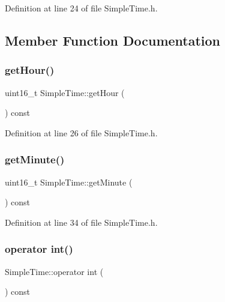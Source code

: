 Definition at line 24 of file Simple\+Time.\+h.



\subsection{Member Function Documentation}
\mbox{\label{class_simple_time_a386922a41d88aaab69497730b163cadf}} 
\subsubsection{\texorpdfstring{getHour()}{getHour()}}
{\footnotesize\ttfamily uint16\+\_\+t Simple\+Time\+::get\+Hour (\begin{DoxyParamCaption}{ }\end{DoxyParamCaption}) const\hspace{0.3cm}{\ttfamily [inline]}}



Definition at line 26 of file Simple\+Time.\+h.

\mbox{\label{class_simple_time_a02c7df278fb87be73998306330198018}} 
\subsubsection{\texorpdfstring{getMinute()}{getMinute()}}
{\footnotesize\ttfamily uint16\+\_\+t Simple\+Time\+::get\+Minute (\begin{DoxyParamCaption}{ }\end{DoxyParamCaption}) const\hspace{0.3cm}{\ttfamily [inline]}}



Definition at line 34 of file Simple\+Time.\+h.

\mbox{\label{class_simple_time_a9d034d06249024ed0366c99029243168}} 
\subsubsection{\texorpdfstring{operator int()}{operator int()}}
{\footnotesize\ttfamily Simple\+Time\+::operator int (\begin{DoxyParamCaption}{ }\end{DoxyParamCaption}) const\hspace{0.3cm}{\ttfamily [inline]}}


